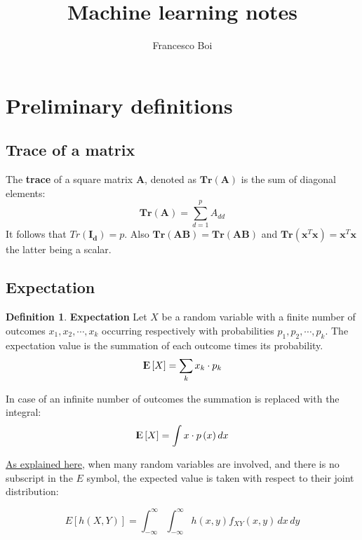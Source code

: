 \documentclass[12pt, letterpaper]{article}
\theoremstyle{definition}
\newtheorem{definition}{Definition}[section]
\newcommand{\E}{{\rm I\kern-.3em E}}
\newcommand{\Tr}{\mathbf{Tr}}
\newcommand{\x}{\mathbf{x}}
\begin{document}
\title{Machine learning notes}
\author{Francesco Boi}
\date{\vspace{-5ex}}
\maketitle
{}


\section{Preliminary definitions}

\subsection{Trace of a matrix}
\label{trace}
The \textbf{trace} of a square matrix $\mathbf{A}$, denoted as $\Tr(\mathbf{A})$ is the sum of diagonal elements:
\begin{equation}
\Tr(\mathbf{A}) = \sum_{d=1}^p A_{dd}
\end{equation}
It follows that $Tr(\mathbf{I_d}) = p$.
Also $\Tr(\mathbf{AB}) = \Tr(\mathbf{AB})$ and $\Tr(\x^T\x) = \x^T\x$ the latter being a scalar.

\subsection{Expectation}
\begin{definition}{\textbf{Expectation}}
Let $X$ be a random variable with a finite number of outcomes $x_1, x_2, \cdots, x_k$ occurring respectively with probabilities $p_1, p_2, \cdots, p_k$. The expectation value is the summation of each outcome times its probability.
\begin{equation}
\E\left[ X\right]= \sum_k x_k \cdot p_k
\end{equation}

In case of an infinite number of outcomes the summation is replaced with the integral:
\begin{equation}
\E\left[ X\right]= \int x \cdot p\left(x \right) dx
\end{equation}
\end{definition}

\href{https://stats.stackexchange.com/a/72614/238980}{As explained here}, when many random variables are involved, and there is no subscript in the $E$ symbol, the expected value is taken with respect to their joint distribution:

$$E[h(X,Y)] = \int_{-\infty}^\infty \int_{-\infty}^\infty h(x,y) f_{XY}(x,y) \, dx \, dy$$
\end{document}
